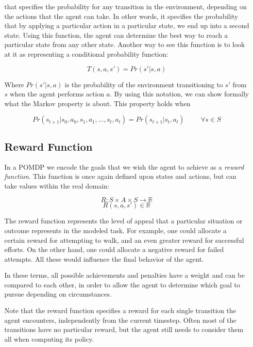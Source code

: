 that specifies the probability for any transition in the environment, depending on the actions that
the agent can take. In other words, it specifies the probability that by applying a particular
action in a particular state, we end up into a second state. Using this function, the agent can
determine the best way to reach a particular state from any other state. Another way to see this
function is to look at it as representing a conditional probability function:

\[ T(s, a, s') = Pr(s' | s, a) \]

Where $Pr(s'|s,a)$ is the probability of the environment transitioning to $s'$ from $s$ when the
agent performs action $a$. By using this notation, we can show formally what the Markov property is
about. This property holds when

\[ Pr(s_{t+1} | s_{0}, a_{0}, s_{1}, a_{1}, ..., s_{t}, a_{t} ) = Pr(s_{t+1} | s_t, a_t ) \hspace{1cm} \forall s \in S \]

\subsection{Reward Function}

In a POMDP we encode the goals that we wish the agent to achieve as a \textit{reward function}.
This function is once again  defined upon states and actions, but  can take values within the real
domain:

\[ R: S\times A\times S \rightarrow \mathbb{R} \]
\[ R(s, a, s') \in \mathbb{R} \]

The reward function represents the level of appeal that a particular situation or outcome represents
in the modeled task. For example, one could allocate a certain reward for attempting to walk, and an
even greater reward for successful efforts. On the other hand, one could allocate a negative reward
for failed attempts. All these would influence the final behavior of the agent.

In these terms, all possible achievements and penalties have a weight and can be compared to each
other, in order to allow the agent to determine which goal  to pursue depending on circumstances.

Note that the reward function specifies a reward for each single transition the agent encounters,
independently from the current timestep. Often most of the transitions have no particular reward,
but the agent still needs to consider them all when computing its policy.

